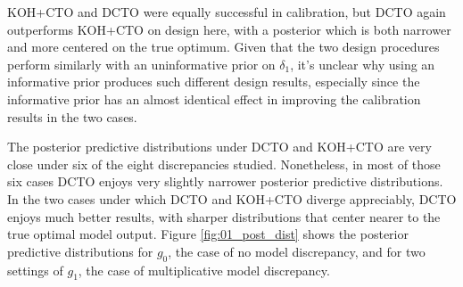 \documentclass[12pt]{article}
\begin{document}
%
KOH+CTO and DCTO were equally successful in calibration, but DCTO again outperforms KOH+CTO on design here, with a posterior which is both narrower and more centered on the true optimum.
%
Given that the two design procedures perform similarly with an uninformative prior on $\delta_1$, it's unclear why using an informative prior produces such different design results, especially since the informative prior has an almost identical effect in improving the calibration results in the two cases.
%

%
The posterior predictive distributions under DCTO and KOH+CTO are very close under six of the eight discrepancies studied.
%
Nonetheless, in most of those six cases DCTO enjoys very slightly narrower posterior predictive distributions. 
%
In the two cases under which DCTO and KOH+CTO diverge appreciably, DCTO enjoys much better results, with sharper distributions that center nearer to the true optimal model output.
%
Figure \ref{fig:01_post_dist} shows the posterior predictive distributions for $g_0$, the case of no model discrepancy, and for two settings of $g_1$, the case of multiplicative model discrepancy.
%
\end{document}
